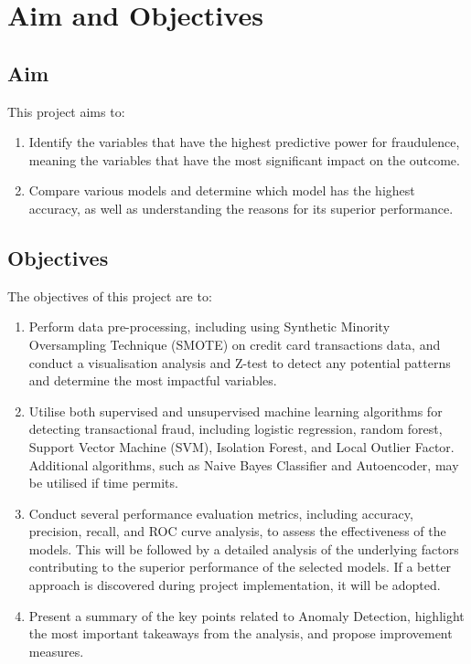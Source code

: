 \section{Aim and Objectives}

\subsection{Aim}
This project aims to:
\begin{enumerate}
  \item Identify the variables that have the highest predictive power for fraudulence, meaning the variables that have the most significant impact on the outcome.
  \item Compare various models and determine which model has the highest accuracy, as well as understanding the reasons for its superior performance.
\end{enumerate}
\subsection{Objectives}
The objectives of this project are to:
\begin{enumerate}
  \item Perform data pre-processing, including using Synthetic Minority Oversampling Technique (SMOTE) on credit card transactions data, and conduct a visualisation analysis and Z-test to detect any potential patterns and determine the most impactful variables.
  \item Utilise both supervised and unsupervised machine learning algorithms for detecting transactional fraud, including logistic regression, random forest, Support Vector Machine (SVM), Isolation Forest, and Local Outlier Factor. Additional algorithms, such as Naive Bayes Classifier and Autoencoder, may be utilised if time permits.
  \item Conduct several performance evaluation metrics, including accuracy, precision, recall, and ROC curve analysis, to assess the effectiveness of the models. This will be followed by a detailed analysis of the underlying factors contributing to the superior performance of the selected models. If a better approach is discovered during project implementation, it will be adopted.
  \item Present a summary of the key points related to Anomaly Detection, highlight the most important takeaways from the analysis, and propose improvement measures.
\end{enumerate}


